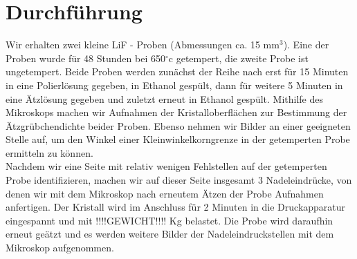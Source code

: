 \section{Durchführung}
	Wir erhalten zwei kleine LiF - Proben (Abmessungen ca. 15   mm$^3$). Eine der Proben wurde für 48 Stunden 
	bei 650$^{\circ}$c getempert, die zweite Probe ist ungetempert. Beide Proben werden zunächst der Reihe nach erst für 15 Minuten in eine
	Polierlösung gegeben, in Ethanol gespült, dann für weitere 5 Minuten in eine Ätzlösung gegeben und zuletzt erneut in Ethanol gespült.
	Mithilfe des Mikroskops machen wir Aufnahmen der Kristalloberflächen zur Bestimmung der Ätzgrübchendichte beider Proben. Ebenso nehmen wir
	Bilder an einer geeigneten Stelle auf, um den Winkel einer Kleinwinkelkorngrenze in der getemperten Probe ermitteln zu können.
	\\
	Nachdem wir eine Seite mit relativ wenigen Fehlstellen auf der getemperten Probe identifizieren, machen wir auf dieser Seite insgesamt 3
	Nadeleindrücke, von denen wir mit dem Mikroskop nach erneutem Ätzen der Probe Aufnahmen anfertigen. Der Kristall wird im Anschluss für 2
	Minuten in die Druckapparatur eingespannt und mit !!!!GEWICHT!!!! Kg belastet. Die Probe wird daraufhin erneut geätzt und es werden weitere
	Bilder der Nadeleindruckstellen mit dem Mikroskop aufgenommen.